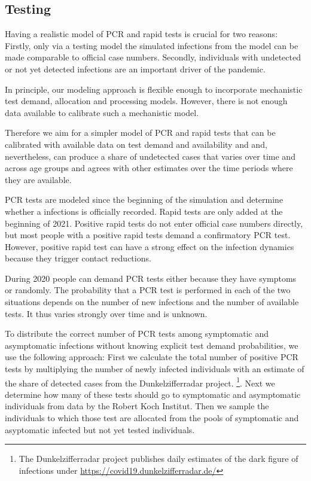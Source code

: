 \subsection{Testing} %
\label{sub:testing}

Having a realistic model of PCR and rapid tests is crucial for two reasons: Firstly,
only via a testing model the simulated infections from the model can be made comparable
to official case numbers. Secondly, individuals with undetected or not yet detected
infections are an important driver of the pandemic.

In principle, our modeling approach is flexible enough to incorporate mechanistic
test demand, allocation and processing models. However, there is not enough data
available to calibrate such a mechanistic model.

Therefore we aim for a simpler model of PCR and rapid tests that can be calibrated with
available data on test demand and availability and and, nevertheless, can produce
a share of undetected cases that varies over time and across age groups and agrees with
other estimates over the time periods where they are available.

PCR tests are modeled since the beginning of the simulation and determine whether a
infections is officially recorded. Rapid tests are only added at the beginning of
2021. Positive rapid tests do not enter official case numbers directly, but most people
with a positive rapid tests demand a confirmatory PCR test. However, positive rapid test
can have a strong effect on the infection dynamics because they trigger contact
reductions.

During 2020 people can demand PCR tests either because they have symptoms or randomly.
The probability that a PCR test is performed in each of the two situations depends on
the number of new infections and the number of available tests. It thus varies strongly
over time and is unknown.

To distribute the correct number of PCR tests among symptomatic and asymptomatic
infections without knowing explicit test demand probabilities, we use the following
approach: First we calculate the total number of positive PCR tests by multiplying the
number of newly infected individuals with an estimate of the share of detected cases
from the Dunkelzifferradar project. \footnote{The Dunkelzifferradar project publishes daily estimates of the dark figure of infections under \url{https://covid19.dunkelzifferradar.de/}}. Next we determine how many of these tests
should go to symptomatic and asymptomatic individuals from data by the Robert Koch
Institut. Then we sample the individuals to which those test
are allocated from the pools of symptomatic and asyptomatic infected but not yet tested
individuals.


